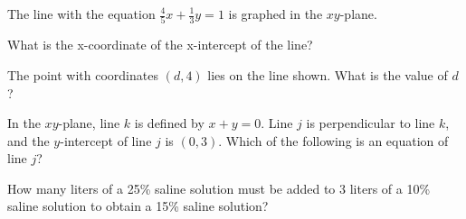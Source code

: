 
\newpage
\noindent\markforreview

\vspace{1em}

The line with the equation \( \frac{4}{5}x + \frac{1}{3}y = 1 \) is graphed in the \( xy \)-plane.

\vspace{2mm}
What is the x-coordinate of the x-intercept of the line?


\vspace{2em}

\noindent\markforreview

\vspace{1em}

\begin{center}
\end{center}

The point with coordinates $(d, 4)$ lies on the line shown. What is the value of $d$?

\vspace{0.75em}


\vspace{2em}

\noindent\markforreview

\vspace{1em}

In the $xy$-plane, line $k$ is defined by $x + y = 0$. Line $j$ is perpendicular to line $k$, and the $y$-intercept of line $j$ is $(0,3)$. Which of the following is an equation of line $j$?

\vspace{0.75em}



\vspace{2em}

\noindent\markforreview

\vspace{1em}

How many liters of a 25\% saline solution must be added to 3 liters of a 10\% saline solution to obtain a 15\% saline solution?


\newpage
